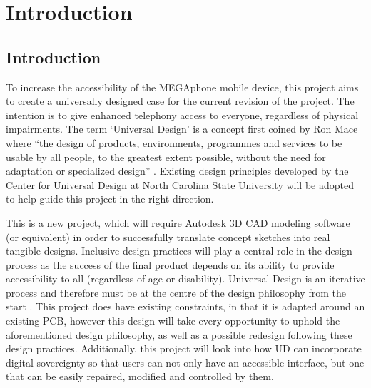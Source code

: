 
\chapter{Introduction}\label{chapter:firstchapter} %

\label{Chapter1} %


\section{Introduction}\label{sec:firstsection}


To increase the accessibility of the MEGAphone mobile device, this project aims to create a universally designed case for the current revision of the project.
The intention is to give enhanced telephony access to everyone, regardless of physical impairments. 
The term ‘Universal Design’ is a concept first coined by Ron Mace where “the design of products, environments, programmes and services to be usable by all people, to the greatest extent possible, without the need for adaptation or specialized design” \cite{nda}. 
Existing design principles developed by the Center for Universal Design at North Carolina State University \cite{sevenprinciples} will be adopted to help guide this project in the right direction.

This is a new project, which will require Autodesk 3D CAD modeling software (or equivalent) in order to successfully translate concept sketches into real tangible designs. 
Inclusive design practices will play a central role in the design process as the success of the final product depends on its ability to provide accessibility to all (regardless of age or disability). 
Universal Design is an iterative process and therefore must be at the centre of the design philosophy from the start \cite{incldesign}. 
This project does have existing constraints, in that it is adapted around an existing PCB, however this design will take every opportunity to uphold the aforementioned design philosophy, as well as a possible redesign following these design practices.
Additionally, this project will look into how UD can incorporate digital sovereignty so that users can not only have an accessible interface, but one that can be easily repaired, modified and controlled by them.

